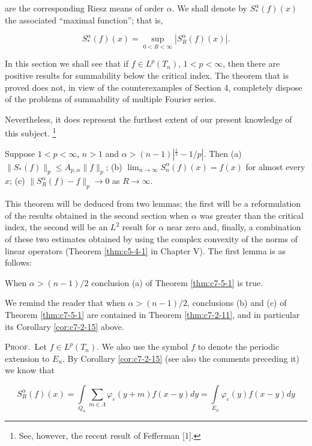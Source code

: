 are the corresponding Riesz means of order $\alpha$. We shall denote by $S_{*}^{\alpha}(f)(x)$ the associated ``maximal function''; that is,

\[
S_{*}^{\alpha}(f)(x)=\sup_{0<R<\infty}\left|S_{R}^{\alpha}(f)(x)\right|.
\]

In this section we shall see that if $f \in L^p(T_n)$, $1 < p < \infty$, then there are positive results for summability below the critical index. The theorem that is proved does not, in view of the counterexamples of Section 4, completely dispose of the problems of summability of multiple Fourier series.

Nevertheless, it does represent the furthest extent of our present knowledge of this subject. \footnote{See, however, the recent result of Fefferman [1].}

\begin{theorem}
\label{thm:c7-5-1}
Suppose $1 < p < \infty$, $n > 1$ and $\alpha > (n - 1)|^{\frac{1}{2}} - 1/p|$. Then
(a) $\|S_*(f)\|_p \leq A_{p,\alpha}\|f\|_p$;
(b) $\lim_{n \to \infty} S_n^\alpha(f)(x) = f(x)$ for almost every $x$;
(c) $\|S_R^\alpha(f) - f\|_p \to 0$ as $R \to \infty$.
\end{theorem}

This theorem will be deduced from two lemmas; the first will be a reformulation of the results obtained in the second section when $\alpha$ was greater than the critical index, the second will be an $L^{2}$ result for $\alpha$ near zero and, finally, a combination of these two estimates obtained by using the complex convexity of the norms of linear operators (Theorem \ref{thm:c5-4-1} in Chapter V). The first lemma is as follows:

\begin{lemma}
\label{lem:c7-5-2}
When $\alpha > (n-1)/2$ conclusion (a) of Theorem \ref{thm:c7-5-1} is true.
\end{lemma}

We remind the reader that when $\alpha > (n-1)/2$, conclusions (b) and (c) of Theorem \ref{thm:c7-5-1} are contained in Theorem \ref{thm:c7-2-11}, and in particular its Corollary \ref{cor:c7-2-15} above.

\textsc{Proof.}\ Let $f \in L^p(T_n)$. We also use the symbol $f$ to denote the periodic extension to $E_n$. By Corollary \ref{cor:c7-2-15} (see also the comments preceding it) we know that

\[
S_{R}^{\alpha}(f)(x)=\int\limits_{Q_{n}}\sum_{m\in\Lambda}\varphi_{\varepsilon}(y+m)f(x-y)d y=\int\limits_{E_{n}}\varphi_{\varepsilon}(y)f(x-y)d y
\]

